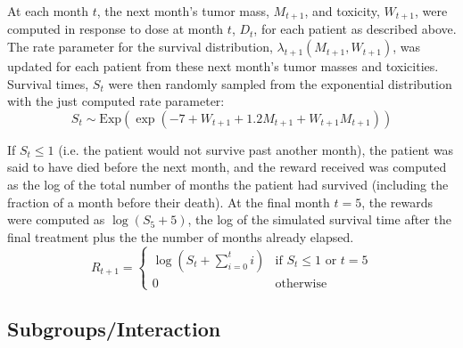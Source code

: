 \documentclass[12pt]{article}
\begin{document}
At each month $t$, the next month's tumor mass, $M_{t + 1}$, and toxicity, $W_{t + 1}$, were computed in response to dose at month $t$, $D_{t}$, for each patient as described above. The rate parameter for the survival distribution, $\lambda_{t+1}(M_{t + 1}, W_{t + 1})$, was updated for each patient from these next month's tumor masses and toxicities. Survival times, $S_{t}$ were then randomly sampled from the exponential distribution with the just computed rate parameter:
\begin{equation}
  S_{t} \sim \text{Exp}(\exp(-7 + W_{t+1} + 1.2 M_{t+1} + W_{t+1} M_{t+1}))
\end{equation}

If $S_{t} \leq 1$ (i.e. the patient would not survive past another month), the patient was said to have died before the next month, and the reward received was computed as the log of the total number of months the patient had survived (including the fraction of a month before their death). At the final month $t = 5$, the rewards were computed as $\log(S_{5} + 5)$, the log of the simulated survival time after the final treatment plus the the number of months already elapsed. 
\begin{equation}
  R_{t + 1} = \begin{cases}
    \log(S_{t} + \sum_{i = 0}^{t} i) & \text{if } S_{t} \leq 1 \text{ or } t = 5 \\
    0 & \text{otherwise}
  \end{cases}
\end{equation}



\subsection{Subgroups/Interaction} %
\label{sub:subgroups_interaction}
\end{document}
